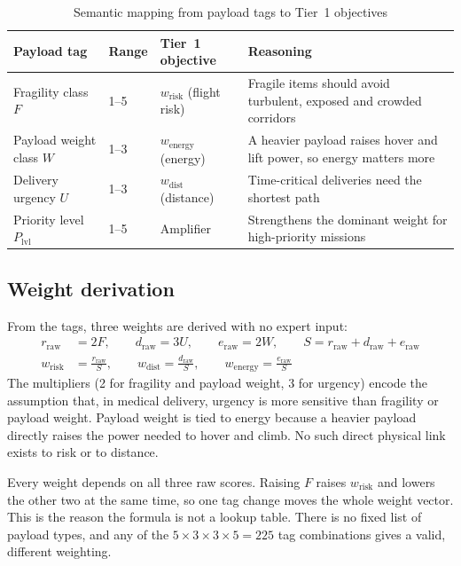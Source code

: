 \begin{table}[!htbp]
\centering
\caption{Semantic mapping from payload tags to Tier~1 objectives}\label{tab:semantic-mapping}
\small
\begin{tabular}{|P{3.0cm}|P{1.2cm}|P{3.6cm}|P{6.2cm}|}
\hline
\textbf{Payload tag} & \textbf{Range} & \textbf{Tier~1 objective} & \textbf{Reasoning}\\
\hline
Fragility class $F$ & 1--5 & $w_\mathrm{risk}$ (flight risk) & Fragile items should avoid turbulent, exposed and crowded corridors\\
\hline
Payload weight class $W$ & 1--3 & $w_\mathrm{energy}$ (energy) & A heavier payload raises hover and lift power, so energy matters more\\
\hline
Delivery urgency $U$ & 1--3 & $w_\mathrm{dist}$ (distance) & Time-critical deliveries need the shortest path\\
\hline
Priority level $P_\mathrm{lvl}$ & 1--5 & Amplifier & Strengthens the dominant weight for high-priority missions\\
\hline
\end{tabular}
\end{table}

\subsection{Weight derivation}

From the tags, three weights are derived with no expert input:
\begin{align}
  r_\mathrm{raw} &= 2F, \qquad d_\mathrm{raw} = 3U, \qquad e_\mathrm{raw} = 2W,
  \qquad S = r_\mathrm{raw} + d_\mathrm{raw} + e_\mathrm{raw} \label{eq:raw}\\
  w_\mathrm{risk} &= \frac{r_\mathrm{raw}}{S}, \qquad
  w_\mathrm{dist} = \frac{d_\mathrm{raw}}{S}, \qquad
  w_\mathrm{energy} = \frac{e_\mathrm{raw}}{S} \label{eq:weights}
\end{align}
The multipliers (2 for fragility and payload weight, 3 for urgency) encode the
assumption that, in medical delivery, urgency is more sensitive than fragility or
payload weight. Payload weight is tied to energy because a heavier payload directly
raises the power needed to hover and climb. No such direct physical link exists to risk
or to distance.

Every weight depends on all three raw scores. Raising $F$ raises $w_\mathrm{risk}$ and
lowers the other two at the same time, so one tag change moves the whole weight vector.
This is the reason the formula is not a lookup table. There is no fixed list of payload
types, and any of the $5 \times 3 \times 3 \times 5 = 225$ tag combinations gives a
valid, different weighting.

